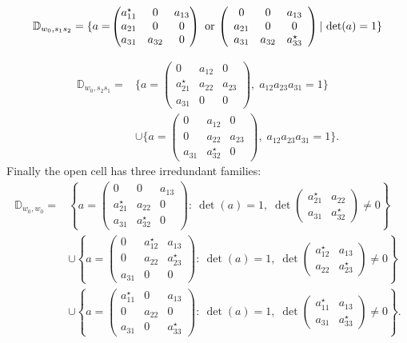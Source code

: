 \documentclass[12pt]{amsart}
\newcommand{\D}{\mathbb D}
\theoremstyle{plain}
\theoremstyle{definition}
\theoremstyle{remark}
\begin{document}
\[
\D_{w_0,s_1s_2}
=\{a=\!
\begin{pmatrix}
a_{11}^\star&0&a_{13} \\
a_{21}&0&0 \\
a_{31}&a_{32}&0
\end{pmatrix}
\textup{ or }\!\left(
\begin{array}{ccc}
0&0&a_{13}\\
a_{21}&0&0\\
a_{31}&a_{32}&a_{33}^\star
\end{array}
\right)| \textup{ det}(a)=1\}
\]

\[
\begin{aligned}
\D_{w_0,s_2s_1}
={}&
\{a=\!\left(
\begin{array}{ccc}
0&a_{12}&0\\
a_{21}^{\star}&a_{22}&a_{23}\\
a_{31}&0&0
\end{array}
\right)\!,\;a_{12}a_{23}a_{31}=1\}\\
&\cup
\{a=\!\left(
\begin{array}{ccc}
0&a_{12}&0\\
0&a_{22}&a_{23}\\
a_{31}&a_{32}^{\star}&0
\end{array}
\right)\!,\;a_{12}a_{23}a_{31}=1\}.
\end{aligned}
\]
Finally the open cell has three irredundant families:
\[
\begin{aligned}
\D_{w_0,w_0}
={}&\left\{
a=\!\begin{pmatrix}
0&0&a_{13}\\
a_{21}^{\star}&a_{22}&0\\
a_{31}&a_{32}^{\star}&0
\end{pmatrix}
:\ \det(a)=1,\;
\det\begin{pmatrix}a_{21}^{\star}&a_{22}\\ a_{31}&a_{32}^{\star}\end{pmatrix}\neq0
\right\}\\
&\cup\left\{
a=\!\begin{pmatrix}
0&a_{12}^{\star}&a_{13}\\
0&a_{22}&a_{23}^{\star}\\
a_{31}&0&0
\end{pmatrix}
:\ \det(a)=1,\;
\det\begin{pmatrix}a_{12}^{\star}&a_{13}\\ a_{22}&a_{23}^{\star}\end{pmatrix}\neq0
\right\}\\
&\cup\left\{
a=\!\begin{pmatrix}
a_{11}^{\star}&0&a_{13}\\
0&a_{22}&0\\
a_{31}&0&a_{33}^{\star}
\end{pmatrix}
:\ \det(a)=1,\;
\det\begin{pmatrix}a_{11}^{\star}&a_{13}\\ a_{31}&a_{33}^{\star}\end{pmatrix}\neq0
\right\}.
\end{aligned}
\]
\end{document}
